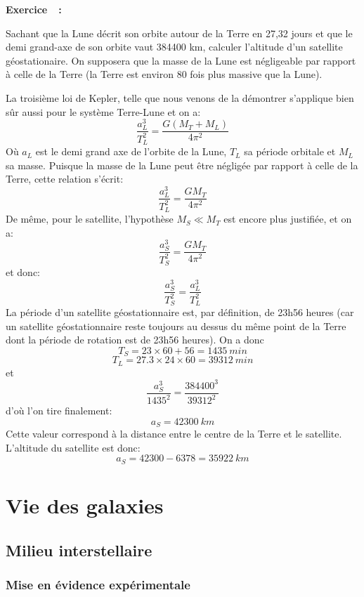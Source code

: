 \documentclass[a4paper,10pt]{report}
\newcounter{noexo}
\newenvironment{Exercise}[1][]{%
  \stepcounter{noexo}
  \medskip\noindent\textbf{Exercice~\thenoexo~:~#1}
  \medskip\par
  \addcontentsline{toc}{paragraph}{Exercice~\thenoexo~:~#1}
}{}
\begin{document}
\begin{Exercise}
  Sachant que la Lune décrit son orbite autour de la Terre en 27,32
  jours et que le demi grand-axe de son orbite vaut 384400 km,
  calculer l'altitude d'un satellite géostationaire. On supposera que
  la masse de la Lune est négligeable par rapport à celle de la Terre
  (la Terre est environ 80 fois plus massive que la Lune).
\end{Exercise}

\begin{Answer}
  La troisième loi de Kepler, telle que nous venons de la démontrer
  s'applique bien sûr aussi pour le système Terre-Lune et on a:
  $$
  \frac{a^3_L}{T^2_L} = \frac{G(M_T + M_L)}{4\pi^2}
  $$
  Où $a_L$ est le demi grand axe de l'orbite de la Lune, $T_L$ sa
  période orbitale et $M_L$ sa masse. Puisque la masse de la Lune peut
  être négligée par rapport à celle de la Terre, cette relation s'écrit:
  $$
  \frac{a^3_L}{T^2_L} = \frac{GM_T}{4\pi^2}
  $$
  De même, pour le satellite, l'hypothèse $M_S \ll M_T$ est encore plus
  justifiée, et on a:
  $$
  \frac{a^3_S}{T^2_S} = \frac{GM_T}{4\pi^2}
  $$
  et donc:
  $$
  \frac{a^3_S}{T^2_S} = \frac{a^3_L}{T^2_L}
  $$
  La période d'un satellite géostationnaire est, par définition, de 23h56
  heures (car un satellite géostationnaire reste toujours au dessus du
  même point de la Terre dont la période de rotation est de 23h56
  heures). On a donc
  $$
  T_S = 23 \times 60 + 56 = 1435~min
  $$
  $$
  T_L = 27.3 \times 24 \times 60 = 39312~min
  $$
  et
  $$
  \frac{a^3_S}{1435^2} = \frac{384400^3}{39312^2}
  $$
  d'où l'on tire finalement:
  $$
  a_S = 42300~km
  $$
  Cette valeur correspond à la distance entre le centre de la Terre et
  le satellite. L'altitude du satellite est donc:
  $$
  a_S = 42300 - 6378 = 35922~km
  $$
\end{Answer}

\chapter{Vie des galaxies}


\section{Milieu interstellaire}

\subsection{Mise en évidence expérimentale}
\end{document}
